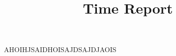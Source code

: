 \documentclass{projdoc}
\title{Time Report}
\begin{document}
AHOIHJSAIDHOISAJDSAJDJAOIS
\end{document}
